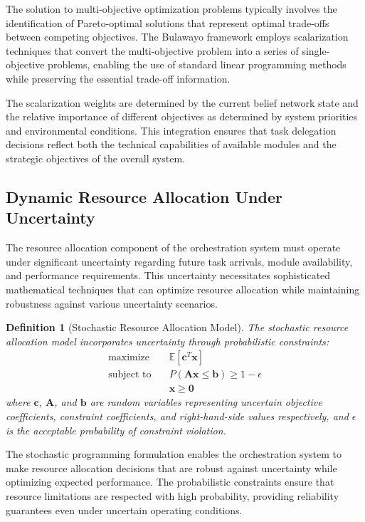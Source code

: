 \documentclass[12pt,a4paper]{article}
\newtheorem{definition}[theorem]{Definition}
\begin{document}
The solution to multi-objective optimization problems typically involves the identification of Pareto-optimal solutions that represent optimal trade-offs between competing objectives. The Bulawayo framework employs scalarization techniques that convert the multi-objective problem into a series of single-objective problems, enabling the use of standard linear programming methods while preserving the essential trade-off information.

The scalarization weights are determined by the current belief network state and the relative importance of different objectives as determined by system priorities and environmental conditions. This integration ensures that task delegation decisions reflect both the technical capabilities of available modules and the strategic objectives of the overall system.

\subsection{Dynamic Resource Allocation Under Uncertainty}

The resource allocation component of the orchestration system must operate under significant uncertainty regarding future task arrivals, module availability, and performance requirements. This uncertainty necessitates sophisticated mathematical techniques that can optimize resource allocation while maintaining robustness against various uncertainty scenarios.

\begin{definition}[Stochastic Resource Allocation Model]
The stochastic resource allocation model incorporates uncertainty through probabilistic constraints:
\begin{align}
\text{maximize} \quad &\mathbb{E}[\mathbf{c}^T \mathbf{x}] \\
\text{subject to} \quad &P(\mathbf{A}\mathbf{x} \leq \mathbf{b}) \geq 1 - \epsilon \\
&\mathbf{x} \geq \mathbf{0}
\end{align}
where $\mathbf{c}$, $\mathbf{A}$, and $\mathbf{b}$ are random variables representing uncertain objective coefficients, constraint coefficients, and right-hand-side values respectively, and $\epsilon$ is the acceptable probability of constraint violation.
\end{definition}

The stochastic programming formulation enables the orchestration system to make resource allocation decisions that are robust against uncertainty while optimizing expected performance. The probabilistic constraints ensure that resource limitations are respected with high probability, providing reliability guarantees even under uncertain operating conditions.
\end{document}
